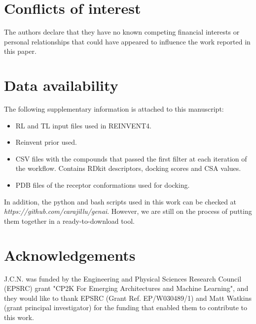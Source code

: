 \documentclass[twoside,twocolumn,9pt]{article}
\renewcommand{\refname}{Notes and references}
\begin{document}
\section*{Conflicts of interest}
The authors declare that they have no known competing financial interests or personal relationships that could have appeared to influence the work reported in this paper. 

\section*{Data availability}
The following supplementary information is attached to this manuscript:
\begin{itemize}
    \item RL and TL input files used in REINVENT4.
    \item Reinvent prior used.
    \item CSV files with the compounds that passed the first filter at each iteration of the workflow. Contains RDkit descriptors, docking scores and CSA values.
    \item PDB files of the receptor conformations used for docking.
\end{itemize}
In addition, the python and bash scripts used in this work can be checked at \textit{https://github.com/carajillu/genai}. However, we are still on the process of putting them together in a ready-to-download tool.

\section*{Acknowledgements}
J.C.N. was funded by the Engineering and Physical Sciences Research Council (EPSRC) grant "CP2K For Emerging Architectures and Machine Learning", and they would like to thank EPSRC (Grant Ref. EP/W030489/1) and Matt Watkins (grant principal investigator) for the funding that enabled them to contribute to this work. 



\balance



\end{document}
